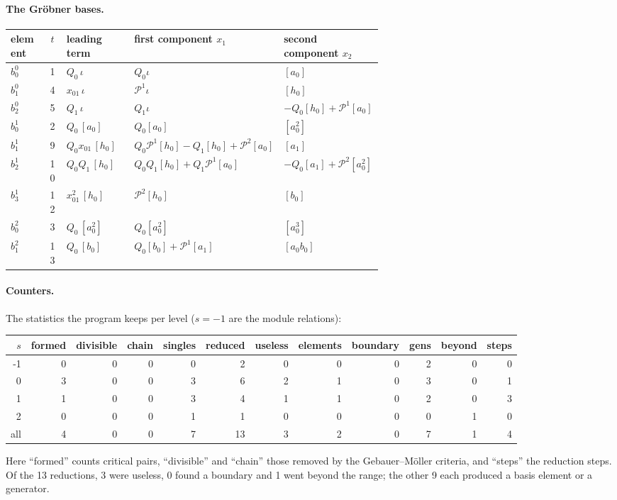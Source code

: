 \documentclass[11pt]{article}
\renewcommand{\P}{\mathcal{P}}
\begin{document}
\paragraph{The Gröbner bases.}
\begin{center}\scriptsize
\begin{longtable}{lcl>{\raggedright\arraybackslash}p{0.35\linewidth}>{\raggedright\arraybackslash}p{0.26\linewidth}}
\toprule
element & $t$ & leading term & first component $x_1$ & second component $x_2$ \\
\midrule\endhead
$b^{0}_{0}$ & 1 & $Q_{0}\,\iota$ & $Q_{0}\iota$ & $[a_0]$ \\
$b^{0}_{1}$ & 4 & $x_{01}\,\iota$ & $\P^{1}\iota$ & $[h_0]$ \\
$b^{0}_{2}$ & 5 & $Q_{1}\,\iota$ & $Q_{1}\iota$ & $-Q_{0}[h_0] + \P^{1}[a_0]$ \\
$b^{1}_{0}$ & 2 & $Q_{0}\,[a_0]$ & $Q_{0}[a_0]$ & $[a_0^2]$ \\
$b^{1}_{1}$ & 9 & $Q_{0}x_{01}\,[h_0]$ & $Q_{0}\P^{1}[h_0] - Q_{1}[h_0] + \P^{2}[a_0]$ & $[a_1]$ \\
$b^{1}_{2}$ & 10 & $Q_{0}Q_{1}\,[h_0]$ & $Q_{0}Q_{1}[h_0] + Q_{1}\P^{1}[a_0]$ & $-Q_{0}[a_1] + \P^{2}[a_0^2]$ \\
$b^{1}_{3}$ & 12 & $x_{01}^{2}\,[h_0]$ & $\P^{2}[h_0]$ & $[b_0]$ \\
$b^{2}_{0}$ & 3 & $Q_{0}\,[a_0^2]$ & $Q_{0}[a_0^2]$ & $[a_0^3]$ \\
$b^{2}_{1}$ & 13 & $Q_{0}\,[b_0]$ & $Q_{0}[b_0] + \P^{1}[a_1]$ & $[a_0b_0]$ \\
\bottomrule
\end{longtable}
\end{center}

\paragraph{Counters.}
The statistics the program keeps per level ($s = -1$ are the module relations):
\begin{center}
\footnotesize\setlength{\tabcolsep}{3.5pt}
\begin{tabular}{rrrrrrrrrrrr}
\toprule
$s$ & formed & divisible & chain & singles & reduced & useless & elements & boundary & gens & beyond & steps \\
\midrule
-1 & 0 & 0 & 0 & 0 & 2 & 0 & 0 & 0 & 2 & 0 & 0 \\
0 & 3 & 0 & 0 & 3 & 6 & 2 & 1 & 0 & 3 & 0 & 1 \\
1 & 1 & 0 & 0 & 3 & 4 & 1 & 1 & 0 & 2 & 0 & 3 \\
2 & 0 & 0 & 0 & 1 & 1 & 0 & 0 & 0 & 0 & 1 & 0 \\
all & 4 & 0 & 0 & 7 & 13 & 3 & 2 & 0 & 7 & 1 & 4 \\
\bottomrule
\end{tabular}
\end{center}
Here ``formed'' counts critical pairs, ``divisible'' and ``chain'' those removed by the Gebauer--M\"oller criteria, and ``steps'' the reduction steps. Of the 13 reductions, 3 were useless, 0 found a boundary and 1 went beyond the range; the other 9 each produced a basis element or a generator.
\end{document}
